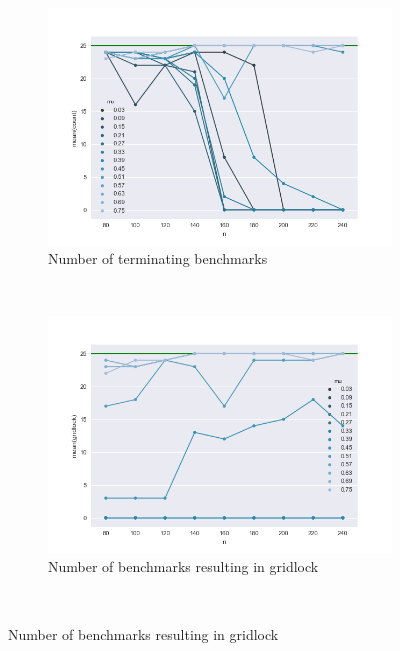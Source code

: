 \begin{figure}
	\centering
    \begin{subfigure}[b]{0.30\textwidth}
        \includegraphics[width=\textwidth]{fig/count_vs_n}
        \caption{Number of terminating benchmarks}
        \label{fig:gull}
    \end{subfigure}
    ~%
    \begin{subfigure}[b]{0.30\textwidth}
        \includegraphics[width=\textwidth]{fig/gridlock_vs_n}
        \caption{Number of benchmarks resulting in gridlock}
        \label{fig:tiger}
    \end{subfigure}
    ~%

\end{figure}
